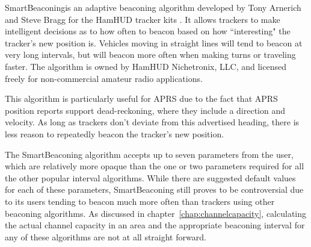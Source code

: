 SmartBeaconing\texttrademark is an adaptive beaconing algorithm developed
by Tony Arnerich and Steve Bragg for the HamHUD tracker kits \cite{smartbeacon}.
It allows trackers to make intelligent decisions as to how often to beacon
based on how ``interesting" the tracker's new position is. 
Vehicles moving in straight lines will tend to beacon at very long intervals,
but will beacon more often when making turns or traveling faster.
The algorithm is owned by HamHUD Nichetronix, LLC, and licensed freely
for non-commercial amateur radio applications.

This algorithm is particularly useful for APRS due to the fact that APRS
position reports support dead-reckoning, where they include a direction and 
velocity.
As long as trackers don't deviate from this advertised heading, there is
less reason to repeatedly beacon the tracker's new position.

The SmartBeaconing algorithm accepts up to seven parameters 
from the user\cite{smartbeaconwiki},
which are relatively more opaque than the one or two parameters required for
all the other popular interval algorithms. 
While there are suggested default values for each of these parameters, 
SmartBeaconing still proves to be controversial due to its users tending to
beacon much more often than 
trackers using other beaconing algorithms\cite{smartbeaconemail1}.
As discussed in chapter~\ref{chap:channelcapacity}, calculating the 
actual channel capacity in an area and the appropriate beaconing interval
for any of these algorithms are not at all straight forward.

